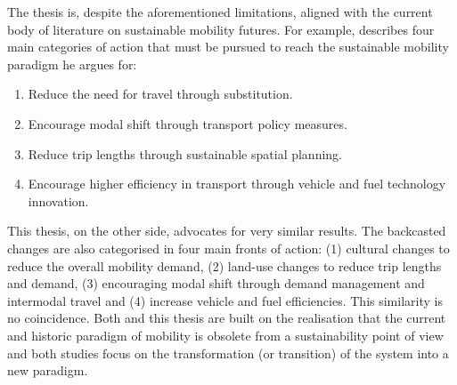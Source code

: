 The thesis is, despite the aforementioned limitations, aligned with the current body of literature on sustainable mobility futures. For example, \textcite{banister2008_sustainablemobilityparadigm} describes four main categories of action that must be pursued to reach the sustainable mobility paradigm he argues for:
\begin{enumerate}
\item Reduce the need for travel through substitution.
\item Encourage modal shift through transport policy measures.
\item Reduce trip lengths through sustainable spatial planning.
\item Encourage higher efficiency in transport through vehicle and fuel technology innovation.
\end{enumerate}
This thesis, on the other side, advocates for very similar results. The backcasted changes are also categorised in four main fronts of action: (1) cultural changes to reduce the overall mobility demand, (2) land-use changes to reduce trip lengths and demand, (3) encouraging modal shift through demand management and intermodal travel and (4) increase vehicle and fuel efficiencies. This similarity is no coincidence. Both \textcite{banister2008_sustainablemobilityparadigm} and this thesis are built on the realisation that the current and historic paradigm of mobility is obsolete from a sustainability point of view and both studies focus on the transformation (or transition) of the system into a new paradigm.



